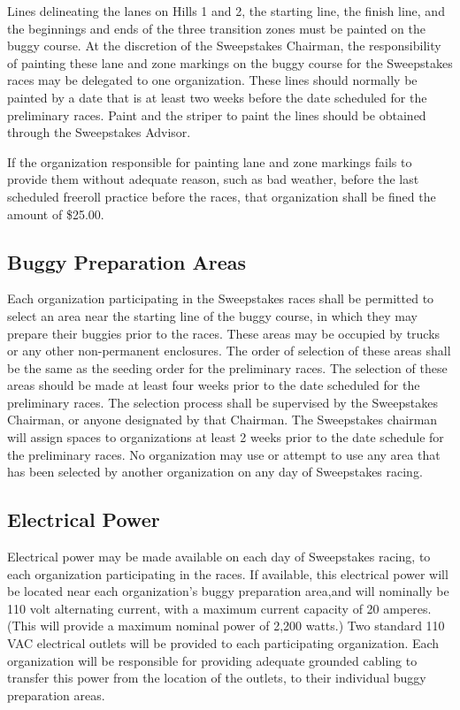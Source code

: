 \documentclass[openany]{book}
\begin{document}
Lines delineating the lanes on Hills 1 and 2, the starting line, the finish line, and the beginnings and ends of the three transition zones must be painted on the buggy course. At the discretion of the Sweepstakes Chairman, the responsibility of painting these lane and zone markings on the buggy course for the Sweepstakes races may be delegated to one organization. These lines should normally be painted by a date that is at least two weeks before the date scheduled for the preliminary races. Paint and the striper to paint the lines should be obtained through the Sweepstakes Advisor.

If the organization responsible for painting lane and zone markings fails to provide them without adequate reason, such as bad weather, before the last scheduled freeroll practice before the races, that organization shall be fined the amount of \$25.00.

\subsection{Buggy Preparation Areas}

Each organization participating in the Sweepstakes races shall be permitted to select an area near the starting line of the buggy course, in which they may prepare their buggies prior to the races. These areas may be occupied by trucks or any other non-permanent enclosures. The order of selection of these areas shall be the same as the seeding order for the preliminary races. The selection of these areas should be made at least four weeks prior to the date scheduled for the preliminary races. The selection process shall be supervised by the Sweepstakes Chairman, or anyone designated by that Chairman. The Sweepstakes chairman will assign spaces to organizations at least 2 weeks prior to the date schedule for the preliminary races. No organization may use or attempt to use any area that has been selected by another organization on any day of Sweepstakes racing.

\subsection{Electrical Power}

Electrical power may be made available on each day of Sweepstakes racing, to each organization participating in the races. If available, this electrical power will be located near each organization's buggy preparation area,and will nominally be 110 volt alternating current, with a maximum current capacity of 20 amperes. (This will provide a maximum nominal power of 2,200 watts.) Two standard 110 VAC electrical outlets will be provided to each participating organization. Each organization will be responsible for providing adequate grounded cabling to transfer this power from the location of the outlets, to their individual buggy preparation areas.
\end{document}
